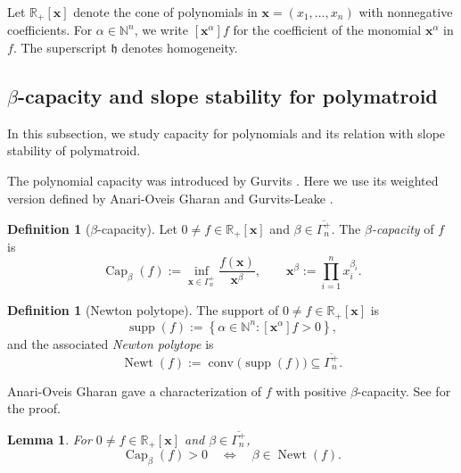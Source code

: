 \documentclass[oneside,english,letterpaper]{amsart}
\numberwithin{equation}{section}
\theoremstyle{plain}
\newtheorem{lem}[thm]{Lemma}
\theoremstyle{definition}
\newtheorem{defn}[thm]{Definition}
\theoremstyle{remark}
\def\R{\mathbb R}
\def\N{\mathbb N}
\def\x{\mathbf{x}}
\def\Newt{\operatorname{Newt}}
\def\Capacity{\operatorname{Cap}}
\begin{document}
Let \(\R_+[\x]\) denote the cone of polynomials in
\(\x=(x_1,\ldots,x_n)\) with nonnegative coefficients. For \(\alpha\in\N^n\), we write \([\x^\alpha]f\) for the coefficient
of the monomial \(\x^\alpha\) in \(f\). The superscript $\mathfrak{h}$ denotes homogeneity.

\subsection{\(\beta\)-capacity and slope stability for polymatroid} \label{subsec:capacity-polymatroid-stability}
In this subsection, we study capacity for polynomials and its relation with slope stability of polymatroid.

The polynomial capacity was introduced by Gurvits \cite{MR2200852}.
Here we use its weighted version defined by Anari-Oveis Gharan and Gurvits-Leake \cite{AnariGharan21,GurvitsLeake21}.

\begin{defn}[\(\beta\)-capacity]
\label{def:beta-capacity}
Let \(0\neq f\in\R_+[\x]\) and
\(\beta\in\overline{\Gamma_n^+}\). The \emph{\(\beta\)-capacity} of
\(f\) is
\[
\Capacity_\beta(f)
:=
\inf_{\x\in\Gamma_n^+}
\frac{f(\x)}{\x^\beta},
\qquad
\x^\beta:=\prod_{i=1}^n x_i^{\beta_i}.
\]
\end{defn}
\begin{defn}[Newton polytope]
\label{def:newton-polytope}
The support of \(0\neq f\in\R_+[\x]\) is
\[
\operatorname{supp}(f)
:=
\left\{
\alpha\in\N^n:[\x^\alpha]f>0
\right\},
\]
and the associated \emph{Newton polytope} is
\[
\Newt(f)
:=
\operatorname{conv}\bigl(\operatorname{supp}(f)\bigr)
\subseteq
\overline{\Gamma_n^+}.
\]
\end{defn}

Anari-Oveis Gharan gave  a characterization of $f$ with positive $\beta$-capacity. See \cite[Fact 2.18]{AnariGharan21} for the proof.
\begin{lem}
\label{lem:beta-capacity-newton}
For \(0\neq f\in\R_+[\x]\) and
\(\beta\in\overline{\Gamma_n^+}\),
\[
\Capacity_\beta(f)>0
\quad\Longleftrightarrow\quad
\beta\in\Newt(f).
\]
\end{lem}
\end{document}
